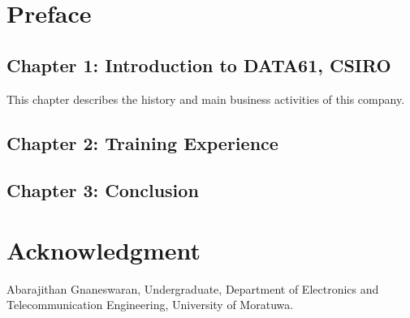 \section*{Preface}
\subsection*{Chapter 1: Introduction to DATA61, CSIRO}
This chapter describes the history and main business activities of this company.
\subsection*{Chapter 2: Training Experience}

\subsection*{Chapter 3: Conclusion}


\newpage
\section*{Acknowledgment}



\vspace*{3cm}

\noindent Abarajithan Gnaneswaran,\newline
Undergraduate,\newline
Department of Electronics and Telecommunication Engineering,\newline
University of Moratuwa.